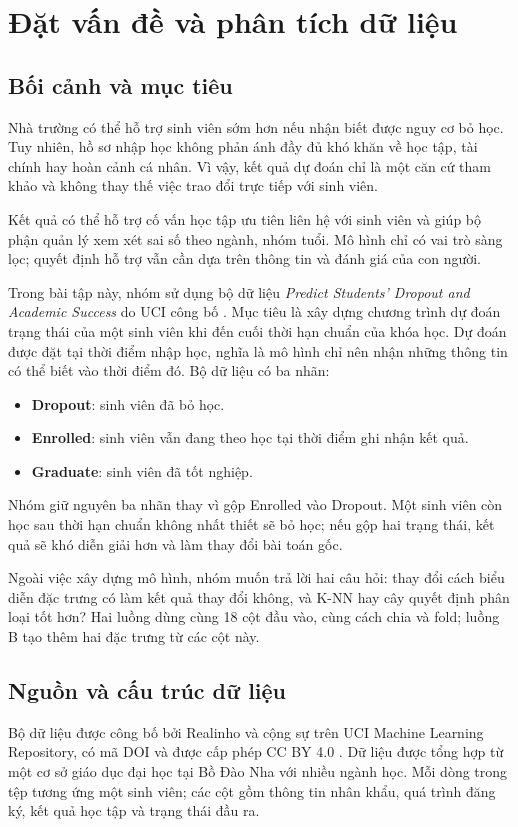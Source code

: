 \chapter{Đặt vấn đề và phân tích dữ liệu}

\section{Bối cảnh và mục tiêu}
Nhà trường có thể hỗ trợ sinh viên sớm hơn nếu nhận biết được nguy cơ bỏ học. Tuy nhiên, hồ sơ nhập học không phản ánh đầy đủ khó khăn về học tập, tài chính hay hoàn cảnh cá nhân. Vì vậy, kết quả dự đoán chỉ là một căn cứ tham khảo và không thay thế việc trao đổi trực tiếp với sinh viên.

Kết quả có thể hỗ trợ cố vấn học tập ưu tiên liên hệ với sinh viên và giúp bộ phận quản lý xem xét sai số theo ngành, nhóm tuổi. Mô hình chỉ có vai trò sàng lọc; quyết định hỗ trợ vẫn cần dựa trên thông tin và đánh giá của con người.

Trong bài tập này, nhóm sử dụng bộ dữ liệu \textit{Predict Students' Dropout and Academic Success} do UCI công bố \cite{uci}. Mục tiêu là xây dựng chương trình dự đoán trạng thái của một sinh viên khi đến cuối thời hạn chuẩn của khóa học. Dự đoán được đặt tại thời điểm nhập học, nghĩa là mô hình chỉ nên nhận những thông tin có thể biết vào thời điểm đó. Bộ dữ liệu có ba nhãn:
\begin{itemize}
    \item \textbf{Dropout}: sinh viên đã bỏ học.
    \item \textbf{Enrolled}: sinh viên vẫn đang theo học tại thời điểm ghi nhận kết quả.
    \item \textbf{Graduate}: sinh viên đã tốt nghiệp.
\end{itemize}
Nhóm giữ nguyên ba nhãn thay vì gộp Enrolled vào Dropout. Một sinh viên còn học sau thời hạn chuẩn không nhất thiết sẽ bỏ học; nếu gộp hai trạng thái, kết quả sẽ khó diễn giải hơn và làm thay đổi bài toán gốc.

Ngoài việc xây dựng mô hình, nhóm muốn trả lời hai câu hỏi: thay đổi cách biểu diễn đặc trưng có làm kết quả thay đổi không, và K-NN hay cây quyết định phân loại tốt hơn? Hai luồng dùng cùng 18 cột đầu vào, cùng cách chia và fold; luồng B tạo thêm hai đặc trưng từ các cột này.

\section{Nguồn và cấu trúc dữ liệu}
Bộ dữ liệu được công bố bởi Realinho và cộng sự trên UCI Machine Learning Repository, có mã DOI và được cấp phép CC BY 4.0 \cite{uci}. Dữ liệu được tổng hợp từ một cơ sở giáo dục đại học tại Bồ Đào Nha với nhiều ngành học. Mỗi dòng trong tệp tương ứng một sinh viên; các cột gồm thông tin nhân khẩu, quá trình đăng ký, kết quả học tập và trạng thái đầu ra.

